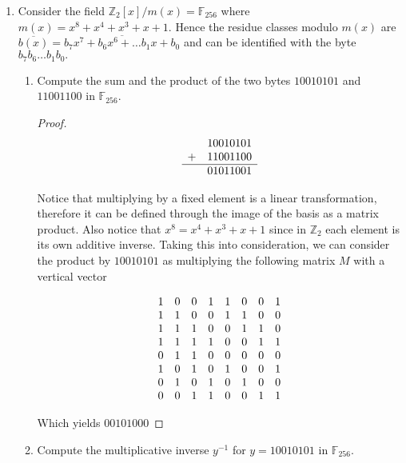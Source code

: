 \documentclass[12pt]{article}
\begin{document}
\begin{enumerate}
    \item Consider the field $\mathbb{Z}_2[x]/m(x) =\mathbb{F}_{256}$ where $m(x) = x^8+x^4+x^3+x+1$. Hence the residue classes modulo $m(x)$ are $\overline{b(x)} = \overline{b_7 x^7 + b_6 x^6 + \ldots b_1x + b_0}$ and can be identified with the byte $b_7b_6 \ldots b_1 b_0.$
    
    \begin{enumerate}
        \item Compute the sum and the product of the two bytes $10010101$ and $11001100$ in $\mathbb{F}_{256}.$
        \begin{proof}
        $$ \begin{array}{cr}
             &  10010101 \\
            + & 11001100\\
            \hline
            & 01011001 \\ 
        \end{array}$$
        
        Notice that multiplying by a fixed element is a linear transformation, therefore it can be defined through the image of the basis as a matrix product. Also notice that $x^8 = x^4 + x^3 +x + 1$ since in $\mathbb{Z}_2$ each element is its own additive inverse. Taking this into consideration, we can consider the product by $10010101$ as multiplying the following matrix $ M$ with a vertical vector
        
        $$\begin{array}{c c c c c c c c}
         1 & 0 & 0 & 1 & 1 & 0 & 0 & 1\\
         1 & 1 & 0 & 0 & 1 & 1 & 0 & 0\\
         1 & 1 & 1 & 0 & 0 & 1 & 1 & 0\\
         1 & 1 & 1 & 1 & 0 & 0 & 1 & 1\\
         0 & 1 & 1 & 0 & 0 & 0 & 0 & 0\\
         1 & 0 & 1 & 0 & 1 & 0 & 0 & 1\\
         0 & 1 & 0 & 1 & 0 & 1 & 0 & 0\\
         0 & 0 & 1 & 1 & 0 & 0 & 1 & 1\\
        \end{array}$$
        
        Which yields $00101000$
        \end{proof}
        \item Compute the multiplicative inverse $y^{-1}$ for $y = 10010101$ in $\mathbb{F}_{256}.$
        

\end{enumerate}
\end{enumerate}
\end{document}
